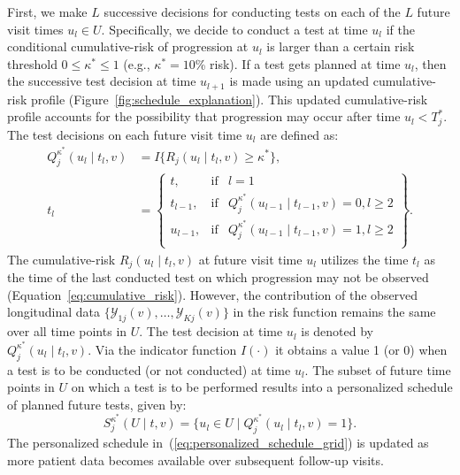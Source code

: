 First, we make $L$ successive decisions for conducting tests on each of the $L$ future visit times $u_l \in U$. Specifically, we decide to conduct a test at time $u_l$ if the conditional cumulative-risk of progression at $u_l$ is larger than a certain risk threshold $0 \leq \kappa^* \leq 1$ (e.g., $\kappa^*=10$\% risk). If a test gets planned at time $u_l$, then the successive test decision at time $u_{l+1}$ is made using an updated cumulative-risk profile (Figure~\ref{fig:schedule_explanation}). This updated cumulative-risk profile accounts for the possibility that progression may occur after time $u_l < T^*_j$. The test decisions on each future visit time $u_l$ are defined as: 
\begin{equation*}
\label{eq:personalized_decision_grid}
\begin{split}
Q_j^{\kappa^*}(u_l \mid t_l, v) &= I\big\{R_j(u_l \mid t_l, v) \geq \kappa^* \big\},\\
t_l &= \left\{\begin{array}{lcr}
  t, &\mbox{if}& l=1\\
  t_{l-1}, &\mbox{if}&  Q_j^{\kappa^*}(u_{l-1} \mid t_{l-1}, v)=0, l\geq 2\\ 
  u_{l-1}, &\mbox{if}&  Q_j^{\kappa^*}(u_{l-1} \mid t_{l-1}, v)=1, l\geq 2\\
\end{array} \right\}.
\end{split}
\end{equation*}
The cumulative-risk $R_j(u_l \mid t_l, v)$ at future visit time $u_l$ utilizes the time $t_l$ as the time of the last conducted test on which progression may not be observed (Equation~\ref{eq:cumulative_risk}). However, the contribution of the observed longitudinal data $\{\mathcal{Y}_{1j}(v), \ldots, \mathcal{Y}_{Kj}(v)\}$ in the risk function remains the same over all time points in $U$. The test decision at time $u_l$ is denoted by ${Q_j^{\kappa^*}(u_l \mid t_l, v)}$. Via the indicator function $I(\cdot)$ it obtains a value 1 (or 0) when a test is to be conducted (or not conducted) at time $u_l$. The subset of future time points in $U$ on which a test is to be performed results into a personalized schedule of planned future tests, given by:
\begin{equation}
\label{eq:personalized_schedule_grid}
S_j^{\kappa^*}(U \mid t, v) = \big\{ u_l \in U \mid Q_j^{\kappa^*}(u_l \mid t_l, v)=1\big\}.
\end{equation}
The personalized schedule in~(\ref{eq:personalized_schedule_grid}) is updated as more patient data becomes available over subsequent follow-up visits.


